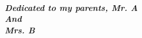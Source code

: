 \begin{titlepage}
\begin{center}
%
\vspace*{0.5cm}
%
\noindent{\large \textbf{\textcolor{white}{Thesis for the B.Sc Engineering}}}\\
\vspace*{1.2cm}
%
\vspace*{5.5cm}
%
\noindent \large \emph{\textbf{Dedicated to my parents, Mr. A  \\
And \\
Mrs. B}} \\
%
\vspace*{4.5cm}
%
\end{center}
\end{titlepage}
\sloppy
%
\titlepage
%
